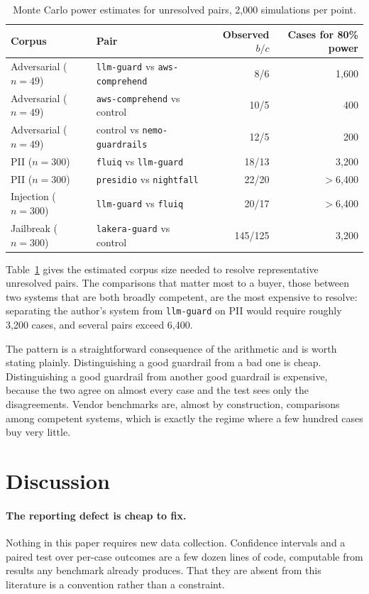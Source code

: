 \documentclass[11pt]{article}
\begin{document}
\begin{table}[t]
\centering
\begin{tabular}{llrr}
\toprule
Corpus & Pair & Observed $b/c$ & Cases for 80\% power \\
\midrule
Adversarial ($n{=}49$) & \texttt{llm-guard} vs \texttt{aws-comprehend} & 8/6 & 1{,}600 \\
Adversarial ($n{=}49$) & \texttt{aws-comprehend} vs control & 10/5 & 400 \\
Adversarial ($n{=}49$) & control vs \texttt{nemo-guardrails} & 12/5 & 200 \\
PII ($n{=}300$) & \texttt{fluiq} vs \texttt{llm-guard} & 18/13 & 3{,}200 \\
PII ($n{=}300$) & \texttt{presidio} vs \texttt{nightfall} & 22/20 & $>$6{,}400 \\
Injection ($n{=}300$) & \texttt{llm-guard} vs \texttt{fluiq} & 20/17 & $>$6{,}400 \\
Jailbreak ($n{=}300$) & \texttt{lakera-guard} vs control & 145/125 & 3{,}200 \\
\bottomrule
\end{tabular}
\caption{Monte Carlo power estimates for unresolved pairs, 2{,}000 simulations
per point.}
\label{tab:power}
\end{table}

Table~\ref{tab:power} gives the estimated corpus size needed to resolve
representative unresolved pairs. The comparisons that matter most to a buyer,
those between two systems that are both broadly competent, are the most expensive
to resolve: separating the author's system from \texttt{llm-guard} on PII would
require roughly 3{,}200 cases, and several pairs exceed 6{,}400.

The pattern is a straightforward consequence of the arithmetic and is worth
stating plainly. Distinguishing a good guardrail from a bad one is cheap.
Distinguishing a good guardrail from another good guardrail is expensive, because
the two agree on almost every case and the test sees only the disagreements.
Vendor benchmarks are, almost by construction, comparisons among competent
systems, which is exactly the regime where a few hundred cases buy very little.

\section{Discussion}

\paragraph{The reporting defect is cheap to fix.}
Nothing in this paper requires new data collection. Confidence intervals and a
paired test over per-case outcomes are a few dozen lines of code, computable from
results any benchmark already produces. That they are absent from this literature
is a convention rather than a constraint.
\end{document}
